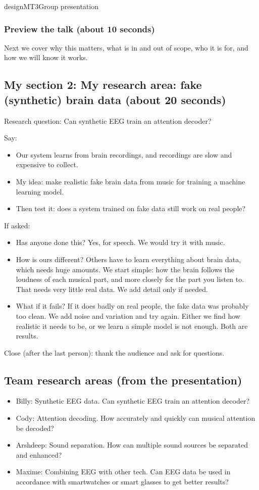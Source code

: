 \begin{entry}{design}{MT3}{Group presentation}
\subsubsection*{Preview the talk (about 10 seconds)}
Next we cover why this matters, what is in and out of scope, who it is for, and how we will know it works.

\subsection*{My section 2: My research area: fake (synthetic) brain data (about 20 seconds)}

Research question: Can synthetic EEG train an attention decoder?

Say:
\begin{itemize}
  \item Our system learns from brain recordings, and recordings are slow and expensive to collect.
  \item My idea: make realistic fake brain data from music for training a machine learning model.
  \item Then test it: does a system trained on fake data still work on real people?
\end{itemize}

If asked:
\begin{itemize}
  \item Has anyone done this? Yes, for speech. We would try it with music.
  \item How is ours different? Others have to learn everything about brain data, which needs huge amounts. We start simple: how the brain follows the loudness of each musical part, and more closely for the part you listen to. That needs very little real data. We add detail only if needed.
  \item What if it fails? If it does badly on real people, the fake data was probably too clean. We add noise and variation and try again. Either we find how realistic it needs to be, or we learn a simple model is not enough. Both are results.
\end{itemize}

Close (after the last person): thank the audience and ask for questions.

\subsection*{Team research areas (from the presentation)}
\begin{itemize}
  \item Billy: Synthetic EEG data. Can synthetic EEG train an attention decoder?
  \item Cody: Attention decoding. How accurately and quickly can musical attention be decoded?
  \item Arshdeep: Sound separation. How can multiple sound sources be separated and enhanced?
  \item Maxime: Combining EEG with other tech. Can EEG data be used in accordance with smartwatches or smart glasses to get better results?
\end{itemize}
\end{entry}

